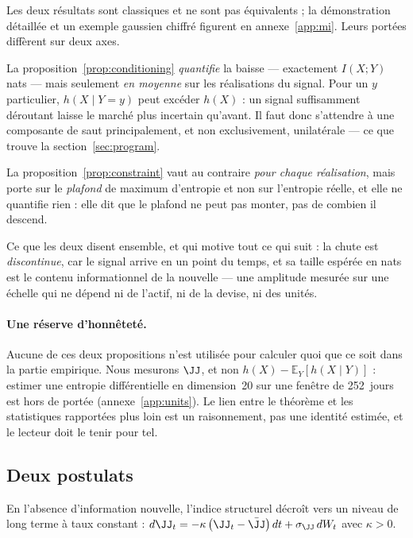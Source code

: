 Les deux résultats sont classiques \citep{cover2006} et ne sont pas
équivalents ; la démonstration détaillée et un exemple gaussien chiffré figurent
en annexe~\ref{app:mi}. Leurs portées diffèrent sur deux axes.

La proposition~\ref{prop:conditioning} \emph{quantifie} la baisse --- exactement
$I(X;Y)$ nats --- mais seulement \emph{en moyenne} sur les réalisations du
signal. Pour un $y$ particulier, $h(X\mid Y=y)$ peut excéder $h(X)$ : un signal
suffisamment déroutant laisse le marché plus incertain qu'avant. Il faut donc
s'attendre à une composante de saut principalement, et non exclusivement,
unilatérale --- ce que trouve la section~\ref{sec:program}.

La proposition~\ref{prop:constraint} vaut au contraire \emph{pour chaque
réalisation}, mais porte sur le \emph{plafond} de maximum d'entropie et non sur
l'entropie réelle, et elle ne quantifie rien : elle dit que le plafond ne peut
pas monter, pas de combien il descend.

Ce que les deux disent ensemble, et qui motive tout ce qui suit : la chute est
\emph{discontinue}, car le signal arrive en un point du temps, et sa taille
espérée en nats est le contenu informationnel de la nouvelle --- une amplitude
mesurée sur une échelle qui ne dépend ni de l'actif, ni de la devise, ni des
unités.

\paragraph{Une réserve d'honnêteté.} Aucune de ces deux propositions n'est
utilisée pour calculer quoi que ce soit dans la partie empirique. Nous mesurons
$\JJ$, et non $h(X)-\mathbb{E}_Y[h(X\mid Y)]$ : estimer une entropie
différentielle en dimension~20 sur une fenêtre de 252~jours est hors de portée
(annexe~\ref{app:units}). Le lien entre le théorème et les statistiques
rapportées plus loin est un raisonnement, pas une identité estimée, et le
lecteur doit le tenir pour tel.

\subsection{Deux postulats}

\begin{postulate}[Relaxation]
\label{p:relax}
En l'absence d'information nouvelle, l'indice structurel décroît vers un niveau
de long terme à taux constant :
$d\JJ_t = -\kappa\left(\JJ_t-\bar\JJ\right)dt + \sigma_\JJ\,dW_t$ avec $\kappa>0$.
\end{postulate}

